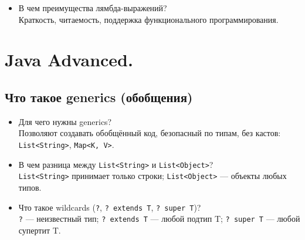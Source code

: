 \documentclass[a4paper,14pt]{article}
\begin{document}
\begin{itemize}
\begin{itemize}
    \item \texttt{UnaryOperator<T>} \\
    Специализация \texttt{Function<T, T>}, принимает и возвращает один тип.
    \begin{lstlisting}[style=javastyle]
UnaryOperator<Integer> square = x -> x * x;
System.out.println(square.apply(5)); // 25
    \end{lstlisting}
    
    \item \texttt{BinaryOperator<T>} \\
    Специализация \texttt{BiFunction<T, T, T>}, принимает два аргумента одного типа, возвращает тот же тип.
    \begin{lstlisting}[style=javastyle]
BinaryOperator<Integer> add = (a, b) -> a + b;
System.out.println(add.apply(2, 3)); // 5
    \end{lstlisting}
\end{itemize}
    \item В чем преимущества лямбда-выражений? \\
    Краткость, читаемость, поддержка функционального программирования.
\end{itemize}

\section{Java Advanced.}
\subsection{Что такое generics (обобщения)}

\begin{itemize}
\item Для чего нужны generics? \\
Позволяют создавать обобщённый код, безопасный по типам, без кастов: \texttt{List<String>}, \texttt{Map<K, V>}.


\item В чем разница между \texttt{List<String>} и \texttt{List<Object>}? \\
\texttt{List<String>} принимает только строки; \texttt{List<Object>} — объекты любых типов.

\item Что такое wildcards (\texttt{?}, \texttt{? extends T}, \texttt{? super T})? \\
\texttt{?} — неизвестный тип; \texttt{? extends T} — любой подтип T; \texttt{? super T} — любой супертит T.


\end{itemize}
\end{document}

